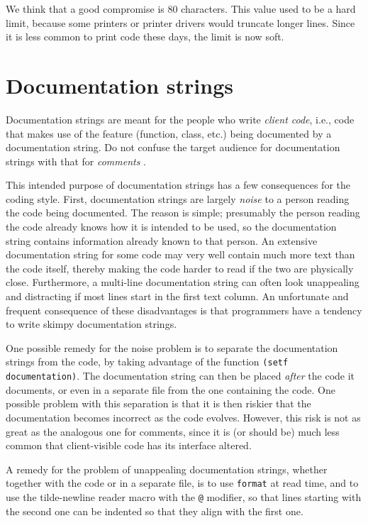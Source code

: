 We think that a good compromise is 80 characters.  This value used to
be a hard limit, because some printers or printer drivers would
truncate longer lines.  Since it is less common to print code these
days, the limit is now soft.

\section{Documentation strings}
\label{sec-general-coding-style-documentation-strings}

Documentation strings are meant for the people who write \emph{client
  code}, i.e., code that makes use of the feature (function, class,
etc.) being documented by a documentation string.  Do not confuse the
target audience for documentation strings with that for
\emph{comments} .

This intended purpose of documentation strings has a few consequences
for the coding style.  First, documentation strings are largely
\emph{noise} to a person reading the code being documented.  The
reason is simple; presumably the person reading the code already knows
how it is intended to be used, so the documentation string contains
information already known to that person.  An extensive documentation
string for some code may very well contain much more text than the
code itself, thereby making the code harder to read if the two are
physically close.  Furthermore, a multi-line documentation string can
often look unappealing and distracting if most lines start in the
first text column.  An unfortunate and frequent consequence of these
disadvantages is that programmers have a tendency to write skimpy
documentation strings.

One possible remedy for the noise problem is to separate the
documentation strings from the code, by taking advantage of the
function \texttt{(setf documentation)}.  The documentation string can
then be placed \emph{after} the code it documents, or even in a
separate file from the one containing the code.  One possible problem
with this separation is that it is then riskier that the documentation
becomes incorrect as the code evolves.  However, this risk is not as
great as the analogous one for comments, since it is (or should be)
much less common that client-visible code has its interface altered.

A remedy for the problem of unappealing documentation strings, whether
together with the code or in a separate file, is to use
\texttt{format} at read time, and to use the tilde-newline reader
macro with the \texttt{@} modifier, so that lines starting with the
second one can be indented so that they align with the first one.

